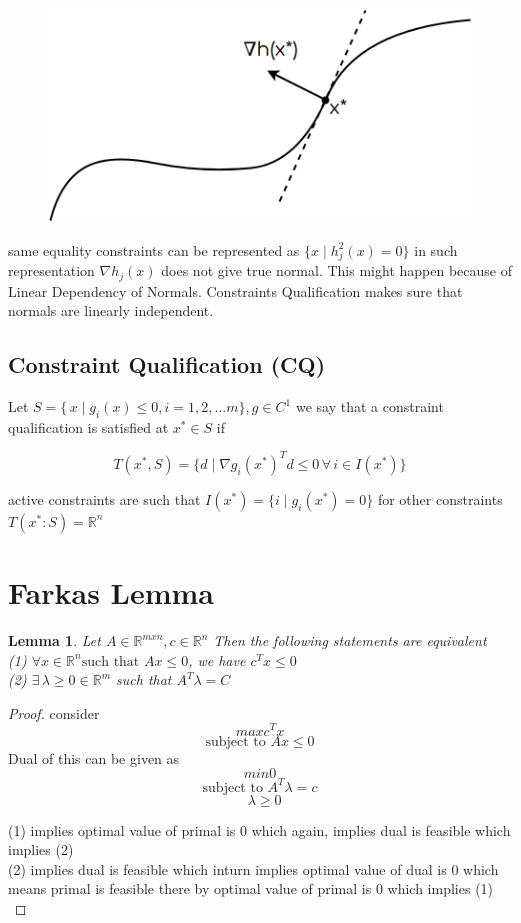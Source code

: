 \documentclass[twoside]{article}
\newtheorem{lemma}[theorem]{Lemma}
\begin{document}
\begin{figure}[h]
\center
\includegraphics[scale=0.25]{images/pic7.png}
\end{figure}

same equality constraints can be represented as $\{ x \mid h^{2}_{j}(x) = 0\}$ in such representation $\nabla h_j(x)$ does not give true normal. This might happen because of Linear Dependency of Normals. Constraints Qualification makes sure that normals are linearly independent.



\subsection{Constraint Qualification (CQ)}
Let $S = \{\,x\mid g_{i}(x)\leq 0 , i = 1,2,...m\},g \in C^{1}  $ we say that a constraint qualification is satisfied at $x^{*}\in S$ if 

$$ T(x^{*},S) = \{d \mid \nabla g_i(x^*)^Td \leq 0\, \forall\, i \in I(x^*)\}$$

active constraints are such that 
$I(x^*)=\{i\mid g_i(x^*)=0\}$
for other constraints $T(x^*:S)= \mathbb{R}^n$

\section{Farkas Lemma}
\begin{lemma}
Let $A\in\mathbb{R}^{m x n}, c\in \mathbb{R}^{n}$ Then the following statements are equivalent \\
(1) $\forall x \in \mathbb{R}^{n} \text{such that }Ax \leq 0 $, we have $c^{T}x\leq 0 $\\
(2) $ \exists \, \lambda \geq 0 \in \mathbb{R}^{m}$ such that $A^{T}\lambda = C $ 
\end{lemma}
\begin{proof}
	consider  $$max c^{T}x $$ $$ \text{subject to } Ax \leq 0$$ Dual of this can be given as $$min 0 $$ $$ \text{subject to }A^{T}\lambda = c$$  $$\text{           }\lambda \geq 0$$

(1) implies optimal value of primal is $0$ which again, implies dual is feasible which implies (2)\\
(2) implies dual is feasible which inturn implies optimal value of dual is 0 which means primal is feasible there by optimal value of primal is 0 which implies (1)\\
\end{proof}
\end{document}
